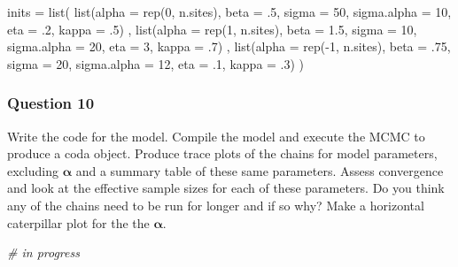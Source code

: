 \documentclass[
]{article}
\newenvironment{Shaded}{\begin{snugshade}}{\end{snugshade}}
\newcommand{\AttributeTok}[1]{\textcolor[rgb]{0.77,0.63,0.00}{#1}}
\newcommand{\CommentTok}[1]{\textcolor[rgb]{0.56,0.35,0.01}{\textit{#1}}}
\newcommand{\DecValTok}[1]{\textcolor[rgb]{0.00,0.00,0.81}{#1}}
\newcommand{\FloatTok}[1]{\textcolor[rgb]{0.00,0.00,0.81}{#1}}
\newcommand{\FunctionTok}[1]{\textcolor[rgb]{0.00,0.00,0.00}{#1}}
\newcommand{\NormalTok}[1]{#1}
\newcommand{\OtherTok}[1]{\textcolor[rgb]{0.56,0.35,0.01}{#1}}
\newcommand{\SpecialCharTok}[1]{\textcolor[rgb]{0.00,0.00,0.00}{#1}}
\begin{document}
\begin{Shaded}
\begin{Highlighting}[]
\NormalTok{inits }\OtherTok{=} \FunctionTok{list}\NormalTok{(}
  \FunctionTok{list}\NormalTok{(}\AttributeTok{alpha =} \FunctionTok{rep}\NormalTok{(}\DecValTok{0}\NormalTok{, n.sites), }\AttributeTok{beta =}\NormalTok{ .}\DecValTok{5}\NormalTok{, }\AttributeTok{sigma =} \DecValTok{50}\NormalTok{, }\AttributeTok{sigma.alpha =} \DecValTok{10}\NormalTok{, }\AttributeTok{eta =}\NormalTok{ .}\DecValTok{2}\NormalTok{, }\AttributeTok{kappa =}\NormalTok{ .}\DecValTok{5}\NormalTok{)}
\NormalTok{  , }\FunctionTok{list}\NormalTok{(}\AttributeTok{alpha =} \FunctionTok{rep}\NormalTok{(}\DecValTok{1}\NormalTok{, n.sites), }\AttributeTok{beta =} \FloatTok{1.5}\NormalTok{, }\AttributeTok{sigma =} \DecValTok{10}\NormalTok{, }\AttributeTok{sigma.alpha =} \DecValTok{20}\NormalTok{, }\AttributeTok{eta =} \DecValTok{3}\NormalTok{, }\AttributeTok{kappa =}\NormalTok{ .}\DecValTok{7}\NormalTok{)}
\NormalTok{  , }\FunctionTok{list}\NormalTok{(}\AttributeTok{alpha =} \FunctionTok{rep}\NormalTok{(}\SpecialCharTok{{-}}\DecValTok{1}\NormalTok{, n.sites), }\AttributeTok{beta =}\NormalTok{ .}\DecValTok{75}\NormalTok{, }\AttributeTok{sigma =} \DecValTok{20}\NormalTok{, }\AttributeTok{sigma.alpha =} \DecValTok{12}\NormalTok{, }\AttributeTok{eta =}\NormalTok{ .}\DecValTok{1}\NormalTok{, }\AttributeTok{kappa =}\NormalTok{ .}\DecValTok{3}\NormalTok{)}
\NormalTok{)}
\end{Highlighting}
\end{Shaded}

\hypertarget{question-10}{%
\subsubsection{Question 10}\label{question-10}}

Write the code for the model. Compile the model and execute the MCMC to
produce a coda object. Produce trace plots of the chains for model
parameters, excluding \(\boldsymbol{\alpha}\) and a summary table of
these same parameters. Assess convergence and look at the effective
sample sizes for each of these parameters. Do you think any of the
chains need to be run for longer and if so why? Make a horizontal
caterpillar plot for the the \(\boldsymbol{\alpha}\).

\begin{Shaded}
\begin{Highlighting}[]
\CommentTok{\# in progress}
\end{Highlighting}
\end{Shaded}
\end{document}
